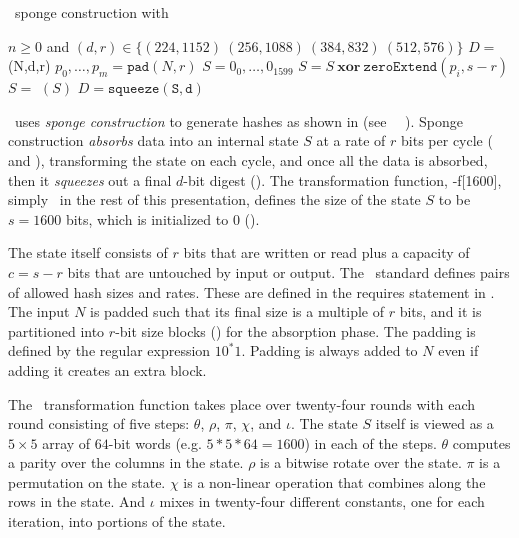 \begin{algorithm}[t]
  \caption{\shaThree\ sponge construction with \keccak}\label{alg:sha3}
  \begin{algorithmic}[1]
    \Require $n \geq 0$ and $(d,r) \in \{(224, 1152)\ (256, 1088)\ (384, 832)\ (512, 576)\}$
    \Ensure $D =$ \shaThree(N,d,r)
    \State $p_0, \ldots, p_m = \mathtt{pad}(N, r)$\label{line:pad}
    \State $S = 0_0, \ldots, 0_{1599}$\label{line:init}
      \State $S = S\ \mathbf{xor}\ \mathtt{zeroExtend}(p_i, s-r)$\label{line:absorb}
      \State $S =$ \keccak$(S)$\label{line:keccak}
    \EndFor
    \State $D = \mathtt{squeeze(S,d)}$\label{line:squeeze}
  \end{algorithmic}
\end{algorithm}

\shaThree\ uses \emph{sponge construction} to generate hashes as shown in  (see \nist\ \fips\ \cite{fips202}).
Sponge construction \emph{absorbs} data into an internal state $S$ at a rate of $r$ bits per cycle ( and ), transforming the state on each cycle, and once all the data is absorbed, then it \emph{squeezes} out a final $d$-bit digest ().
The transformation function, \keccak-f[1600], simply \keccak\ in the rest of this presentation, defines the size of the state $S$ to be $s = 1600$ bits, which is initialized to 0 ().

The state itself consists of $r$ bits that are written or read plus a capacity of $c = s - r$ bits that are untouched by input or output.
The \nist\ standard defines pairs of allowed hash sizes and rates.
These are defined in the requires statement in . 
The input $N$ is padded such that its final size is a multiple of $r$ bits, and it is partitioned into $r$-bit size blocks () for the absorption phase.
The padding is defined by the regular expression $10^*1$.
Padding is always added to $N$ even if adding it creates an extra block.

The \keccak\ transformation function takes place over twenty-four rounds with each round consisting of five steps: $\theta$, $\rho$, $\pi$, $\chi$, and $\iota$.
The state $S$ itself is viewed as a $5 \times 5$ array of $64$-bit words (e.g. $5 * 5 * 64 = 1600$) in each of the steps.
$\theta$ computes a parity over the columns in the state. $\rho$ is a bitwise rotate over the state.
$\pi$ is a permutation on the state. $\chi$ is a non-linear operation that combines along the rows in the state.
And $\iota$ mixes in twenty-four different constants, one for each iteration, into portions of the state.
